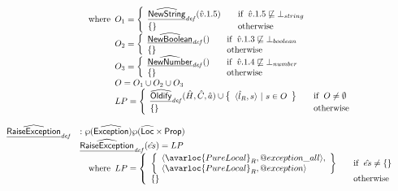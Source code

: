\[\begin{array}{ll}
& \quad\wherec{
  O_1 = \left\{
  \begin{array}{ll}
    \ahf{NewString}_{\it def}(\hat{v}.1.5) &\quad\ifc{\hat{v}.1.5\not\sqsubseteq \bot_{string}}\\
    \set{}&\quad\owc
  \end{array}
  \right.\\
  O_2 = \left\{
  \begin{array}{ll}
    \ahf{NewBoolean}_{\it def}() &\quad\ifc{\hat{v}.1.3\not\sqsubseteq \bot_{boolean}}\\
    \set{}&\quad\owc
  \end{array}
  \right.\\
  O_3 = \left\{
  \begin{array}{ll}
    \ahf{NewNumber}_{\it def}() &\quad\ifc{\hat{v}.1.4\not\sqsubseteq \bot_{number}}\\
    \set{}&\quad\owc
  \end{array}
  \right.\\
  O = O_1\cup O_2\cup O_3\\
  LP = \left\{
  \begin{array}{ll}
    \ahf{Oldify}_{\it def}(\hat{H}, \hat{C}, \hat{a})\cup \set{\langle \hat{l}_R, s\rangle~|~ s\in O}&\quad\ifc{O \not= \emptyset}\\
    \set{}&\quad\owc
  \end{array}
  \right.
}
\\\\
\ahf{RaiseException}_{\it def} & : \powerset{\abs{Exception}} \powerset{\aLoc \times \SF{Prop}}\\
& \ahf{RaiseException}_{\it def}(\hat{es}) = LP\\
& \quad\wherec{
  LP =
  \left\{
    \begin{array}{ll}
      \set{\langle \avarloc{PureLocal}_R, \varprop{exception\_all} \rangle,\\
        \langle \avarloc{PureLocal}_R, \varprop{exception} \rangle
      } & \quad\ifc{\hat{es}\not=\set{}} \\
      \set{} & \quad\owc\\
    \end{array}
  \right.
}
\end{array}
\]
